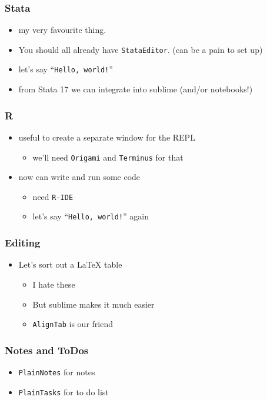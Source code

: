 \documentclass{beamer}
\begin{document}
\begin{frame}
\frametitle{Stata} \label{Stata}
	\begin{itemize}
		\item my very favourite thing.
		\item You should all already have \texttt{StataEditor}. (can be a pain to set up)
		\item let's say ``\texttt{Hello, world!}''
		\item from Stata 17 we can integrate into sublime (and/or notebooks!)
	\end{itemize}
\end{frame}

\begin{frame}
\frametitle{R} \label{R}
	\begin{itemize}
		\item useful to create a separate window for the REPL
		\begin{itemize}
			\item we'll need \texttt{Origami} and \texttt{Terminus} for that
		\end{itemize}
		\item now can write and run some code 
		\begin{itemize}
			\item need \texttt{R-IDE}
			\item let's say ``\texttt{Hello, world!}'' again
		\end{itemize}
	\end{itemize}
\end{frame}

\begin{frame}
\frametitle{Editing} \label{Editing}
	\begin{itemize}
		\item Let's sort out a LaTeX table
		\begin{itemize}
			\item I hate these
			\item But sublime makes it much easier
			\item \texttt{AlignTab} is our friend
		\end{itemize}
	\end{itemize}
\end{frame}

\begin{frame}
\frametitle{Notes and ToDos} \label{Notes and ToDos}
	\begin{itemize}
		\item \texttt{PlainNotes} for notes
		\item \texttt{PlainTasks} for to do list
	\end{itemize}
\end{frame}
\end{document}
